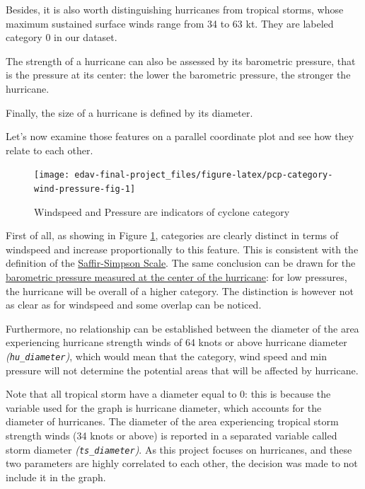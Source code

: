 \documentclass[]{book}
\begin{document}
Besides, it is also worth distinguishing hurricanes from tropical storms, whose maximum sustained surface winds range from 34 to 63 kt. They are labeled category 0 in our dataset.

The strength of a hurricane can also be assessed by its barometric pressure, that is the pressure at its center: the lower the barometric pressure, the stronger the hurricane.

Finally, the size of a hurricane is defined by its diameter.

Let's now examine those features on a parallel coordinate plot and see how they relate to each other.

\begin{figure}

{\centering \texttt{[image: edav-final-project\_files/figure-latex/pcp-category-wind-pressure-fig-1]} 

}

\caption{Windspeed and Pressure are indicators of cyclone category}\label{fig:pcp-category-wind-pressure-fig}
\end{figure}

First of all, as showing in Figure \ref{fig:pcp-category-wind-pressure-fig}, categories are clearly distinct in terms of windspeed and increase proportionally to this feature. This is consistent with the definition of the \href{https://www.nhc.noaa.gov/aboutsshws.php}{Saffir-Simpson Scale}. The same conclusion can be drawn for the \href{https://sciencing.com/barometric-pressure-hurricanes-22734.html}{barometric pressure measured at the center of the hurricane}: for low pressures, the hurricane will be overall of a higher category. The distinction is however not as clear as for windspeed and some overlap can be noticed.

Furthermore, no relationship can be established between the diameter of the area experiencing hurricane strength winds of 64 knots or above hurricane diameter \emph{(\texttt{hu\_diameter})}, which would mean that the category, wind speed and min pressure will not determine the potential areas that will be affected by hurricane.

Note that all tropical storm have a diameter equal to 0: this is because the variable used for the graph is hurricane diameter, which accounts for the diameter of hurricanes. The diameter of the area experiencing tropical storm strength winds (34 knots or above) is reported in a separated variable called storm diameter \emph{(\texttt{ts\_diameter})}. As this project focuses on hurricanes, and these two parameters are highly correlated to each other, the decision was made to not include it in the graph.
\end{document}
